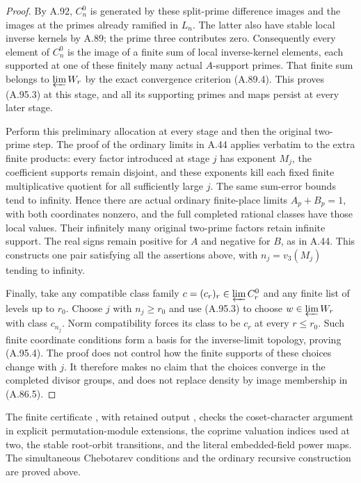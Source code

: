 \begin{proof}
By A.92, $C_n^0$ is generated by these split-prime
difference images and the images at the primes already
ramified in $L_n$.
The latter also have stable local inverse kernels by
A.89; the prime three contributes zero.
Consequently every element of $C_n^0$ is the image of
a finite sum of local inverse-kernel elements, each
supported at one of these finitely many actual
$A$-support primes.
That finite sum belongs to $\varprojlim W_r$ by the
exact convergence criterion (A.89.4).
This proves (A.95.3) at this stage, and all its supporting
primes and maps persist at every later stage.

Perform this preliminary allocation at every stage and
then the original two-prime step.
The proof of the ordinary limits in A.44 applies verbatim
to the extra finite products: every factor introduced at
stage $j$ has exponent $M_j$, the coefficient supports
remain disjoint, and these exponents kill each fixed
finite multiplicative quotient for all sufficiently
large $j$.
The same sum-error bounds tend to infinity.
Hence there are actual ordinary finite-place limits
$A_p+B_p=1$, with both coordinates nonzero, and the
full completed rational classes have those local values.
Their infinitely many original two-prime factors retain
infinite support.  The real signs remain positive for
$A$ and negative for $B$, as in A.44.
This constructs one pair satisfying all the assertions
above, with $n_j=v_3(M_j)$ tending to infinity.

Finally, take any compatible class family
$c=(c_r)_r\in\varprojlim C_r^0$ and any finite list of
levels up to $r_0$.
Choose $j$ with $n_j\ge r_0$ and use (A.95.3) to choose
$w\in\varprojlim W_r$ with class $c_{n_j}$.
Norm compatibility forces its class to be $c_r$ at
every $r\le r_0$.
Such finite coordinate conditions form a basis for the
inverse-limit topology, proving (A.95.4).
The proof does not control how the finite supports of
these choices change with $j$.  It therefore makes no
claim that the choices converge in the completed divisor
groups, and does not replace density by image membership
in (A.86.5).
\end{proof}

\noindent The finite certificate
, with retained
output ,
checks the coset-character argument in explicit permutation-module
extensions, the coprime valuation indices used at two, the stable
root-orbit transitions, and the literal embedded-field power maps.
The simultaneous Chebotarev conditions and the ordinary recursive
construction are proved above.
